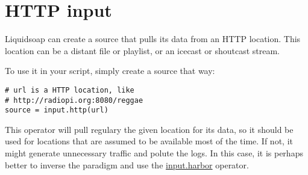 \section{HTTP input}
Liquidsoap can create a source that pulls its data from an HTTP location. This location can 
be a distant file or playlist, or an icecast or shoutcast stream.

To use it in your script, simply create a source that way:

\begin{verbatim}
# url is a HTTP location, like
# http://radiopi.org:8080/reggae
source = input.http(url)
\end{verbatim}
This operator will pull regulary the given location for its data, so it should be used for 
locations that are assumed to be available most of the time. If not, it might generate unnecessary 
traffic and polute the logs. In this case, it is perhaps better to inverse the paradigm and 
use the \href{harbor.html}{input.harbor} operator.

